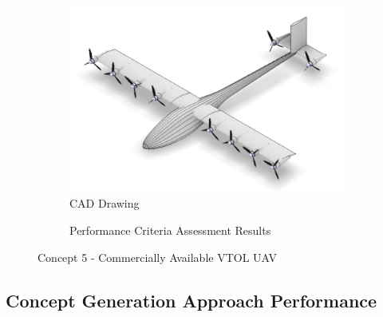 \begin{figure}[H]
\centering
\begin{subfigure}[t]{.5\textwidth}
  \centering
  \includegraphics[width=0.95\linewidth]{Concepts/CAD/Round3_2.png}
  \vspace{0.125cm}
  \caption{CAD Drawing}
  \label{fig:cad1}
\end{subfigure}%
\begin{subfigure}[t]{.5\textwidth}
  \centering
  \caption{Performance Criteria Assessment Results}
  \label{fig:radar1}
\end{subfigure}
\caption{Concept 5 - Commercially Available VTOL UAV}
\label{fig:concept2}
\end{figure}



\subsection{Concept Generation Approach Performance}

